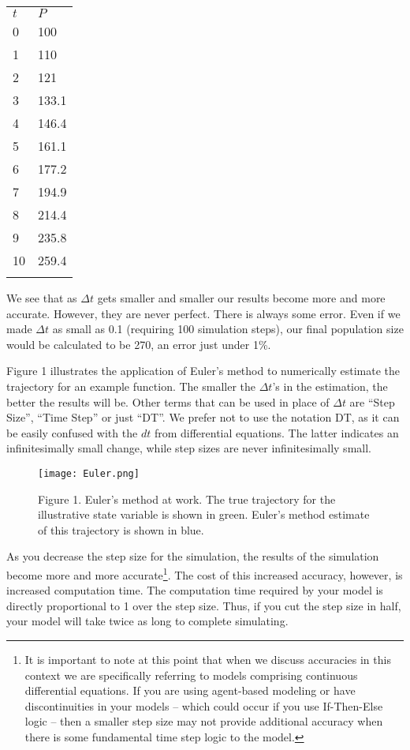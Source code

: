 \documentclass[]{memoir}
\let\Oldincludegraphics\includegraphics
\renewcommand{\includegraphics}[1]{\Oldincludegraphics[max size={\textwidth}{\textheight}]{#1}}
\begin{document}
\begin{longtable}[c]{@{}ll@{}}
\hline\noalign{\medskip}
$t$ & $P$
\\\noalign{\medskip}
\hline\noalign{\medskip}
0 & 100
\\\noalign{\medskip}
1 & 110
\\\noalign{\medskip}
2 & 121
\\\noalign{\medskip}
3 & 133.1
\\\noalign{\medskip}
4 & 146.4
\\\noalign{\medskip}
5 & 161.1
\\\noalign{\medskip}
6 & 177.2
\\\noalign{\medskip}
7 & 194.9
\\\noalign{\medskip}
8 & 214.4
\\\noalign{\medskip}
9 & 235.8
\\\noalign{\medskip}
10 & 259.4
\\\noalign{\medskip}
\hline
\end{longtable}

We see that as $\Delta t$ gets smaller and smaller our results become
more and more accurate. However, they are never perfect. There is always
some error. Even if we made $\Delta t$ as small as 0.1 (requiring 100
simulation steps), our final population size would be calculated to be
270, an error just under 1\%.

Figure 1 illustrates the application of Euler's method to numerically
estimate the trajectory for an example function. The smaller the
$\Delta t$'s in the estimation, the better the results will be. Other
terms that can be used in place of $\Delta t$ are ``Step Size'', ``Time
Step'' or just ``DT''. We prefer not to use the notation DT, as it can
be easily confused with the $dt$ from differential equations. The latter
indicates an infinitesimally small change, while step sizes are never
infinitesimally small.

\begin{figure}[htbp]
\centering
\texttt{[image: Euler.png]}
\caption{Figure 1. Euler's method at work. The true trajectory for the
illustrative state variable is shown in green. Euler's method estimate
of this trajectory is shown in blue.}
\end{figure}

As you decrease the step size for the simulation, the results of the
simulation become more and more accurate\footnote{It is important to
  note at this point that when we discuss accuracies in this context we
  are specifically referring to models comprising continuous
  differential equations. If you are using agent-based modeling or have
  discontinuities in your models -- which could occur if you use
  If-Then-Else logic -- then a smaller step size may not provide
  additional accuracy when there is some fundamental time step logic to
  the model.}. The cost of this increased accuracy, however, is
increased computation time. The computation time required by your model
is directly proportional to 1 over the step size. Thus, if you cut the
step size in half, your model will take twice as long to complete
simulating.
\end{document}
